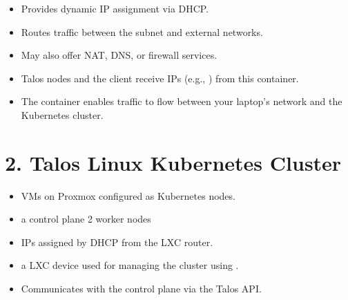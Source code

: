 \documentclass[letterpaper,10pt,english]{sphinxmanual}
\begin{document}
\sphinxAtStartPar
{}
\begin{itemize}
\item {} 
\sphinxAtStartPar
Provides dynamic IP assignment via DHCP.

\item {} 
\sphinxAtStartPar
Routes traffic between the  subnet and external networks.

\item {} 
\sphinxAtStartPar
May also offer NAT, DNS, or firewall services.

\end{itemize}

\sphinxAtStartPar
{}
\begin{itemize}
\item {} 
\sphinxAtStartPar
Talos nodes and the client receive IPs (e.g., ) from this container.

\item {} 
\sphinxAtStartPar
The container enables traffic to flow between your laptop’s network and the Kubernetes cluster.

\end{itemize}


\section{2. Talos Linux Kubernetes Cluster}
\label{\detokenize{setup:talos-linux-kubernetes-cluster}}
\sphinxAtStartPar
{}
\begin{itemize}
\item {} 
\sphinxAtStartPar
VMs on Proxmox configured as Kubernetes nodes.

\item {} 
\sphinxAtStartPar
a control plane 2 worker nodes

\item {} 
\sphinxAtStartPar
IPs assigned by DHCP from the LXC router.

\end{itemize}

\sphinxAtStartPar
{}
\begin{itemize}
\item {} 
\sphinxAtStartPar
a LXC device used for managing the cluster using .

\item {} 
\sphinxAtStartPar
Communicates with the control plane via the Talos API.

\end{itemize}
\end{document}
